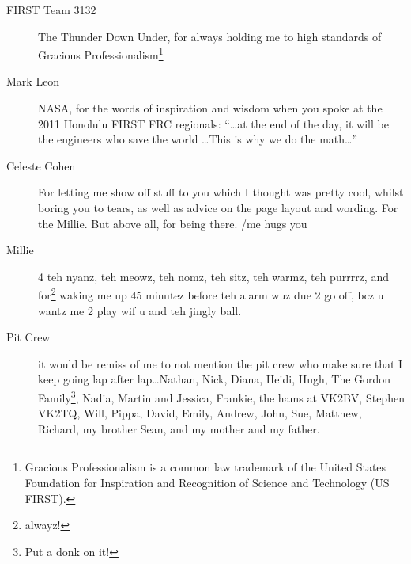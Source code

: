\begin{description}
  \item[FIRST Team 3132] The Thunder Down Under, for always holding me to high
  standards of Gracious Professionalism\texttrademark\footnote{Gracious
  Professionalism is a common law trademark of the United States Foundation for
  Inspiration and Recognition of Science and Technology (US FIRST).}
  
  \item[Mark Leon] NASA, for the words of inspiration and wisdom when you
  spoke at the 2011 Honolulu FIRST FRC regionals:
  ``\ldots at the end of the day, it will be the engineers who save the world
  \ldots This is why we do the math\ldots''
  
  
  \item[Celeste Cohen] For letting me show off stuff to you which I thought
  was pretty cool, whilst boring you to tears, as well as advice on the page
  layout and wording. For the Millie. But above all, for being there. /me hugs
  you
  
  \item[Millie] 4 teh nyanz, teh meowz, teh nomz, teh sitz, teh warmz, teh
  purrrrz, and for\footnote{alwayz!} waking me up 45 minutez before teh
  alarm wuz due 2 go off, bcz u wantz me 2 play wif u and teh jingly ball.
  
  \item[Pit Crew] it would be remiss of me to not mention the pit crew who make
  sure that I keep going lap after lap\ldots Nathan, Nick, Diana, Heidi, Hugh,
  The Gordon Family\footnote{Put a donk on it!}, Nadia, Martin and Jessica,
  Frankie, the hams at VK2BV, Stephen VK2TQ, Will, Pippa, David, Emily, Andrew,
  John, Sue, Matthew, Richard, my brother Sean, and my mother and my father.
\end{description}